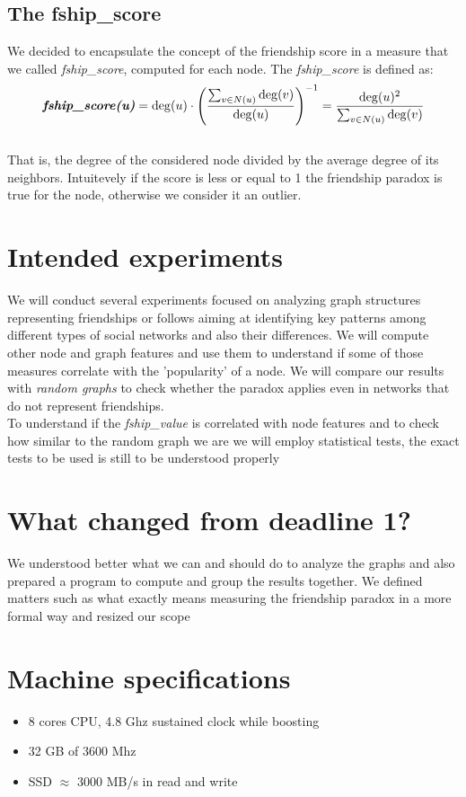 \documentclass{article}
\begin{document}
\subsection{The fship\_score}
We decided to encapsulate the concept of the friendship score in a measure that we called \textit{fship\_score}, computed for each node. 
The \textit{fship\_score} is defined as:
\\\[
\textit{\textbf{fship\_score(u)}} = \deg(u) \cdot \left( \frac{\sum_{v \in N(u)} \deg(v)}{\deg(u)} \right)^{-1} =
\frac{\deg(u)^{2}}{\sum_{v \in N(u)} \deg(v)}
\]\\
That is, the degree of the considered node divided by the average degree of its neighbors. Intuitevely if the score is less or equal to 1 the friendship paradox is true for the node, otherwise we consider it an outlier.


\section{Intended experiments}
We will conduct several experiments focused on analyzing graph structures representing friendships or follows aiming at identifying key patterns among different types of social networks and also their differences.
We will compute other node and graph features and use them to understand if some of those measures correlate with the 'popularity' of a node.
We will compare our results with \textit{random graphs} to check whether the paradox applies even in networks that do not represent friendships. \\
To understand if the \textit{fship\_value} is correlated with node features and to check how similar to the random graph we are we will employ statistical tests, the exact tests to be used is still to be understood properly

\section{What changed from deadline 1?}
We understood better what we can and should do to analyze the graphs and also prepared a program to compute and group the results 
together. We defined matters such as what exactly means measuring the friendship paradox in a more formal way and resized our scope

\section{Machine specifications}
\begin{itemize}
    \item 8 cores CPU, 4.8 Ghz sustained clock while boosting
    \item 32 GB of 3600 Mhz 
    \item SSD $\approx$ 3000 MB/s in read and write
\end{itemize}
\end{document}
